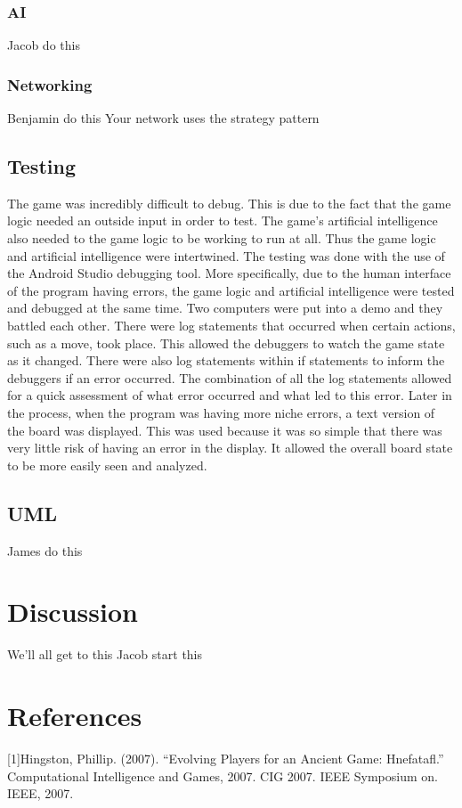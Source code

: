 \documentclass{article}
\begin{document}
\subsubsection{AI}
Jacob do this

\subsubsection{Networking}
Benjamin do this
Your network uses the strategy pattern

\subsection{Testing}
	The game was incredibly difficult to debug. This is due to the fact that the game logic needed an outside input in order to test. The game's artificial intelligence also needed to the game logic to be working to run at all. Thus the game logic and artificial intelligence were intertwined. 
	The testing was done with the use of the Android Studio debugging tool. More specifically, due to the human interface of the program having errors, the game logic and artificial intelligence were tested and debugged at the same time. Two computers were put into a demo and they battled each other. There were log statements that occurred when certain actions, such as a move, took place. This allowed the debuggers to watch the game state as it changed. There were also log statements within if statements to inform the debuggers if an error occurred. The combination of all the log statements allowed for a quick assessment of what error occurred and what led to this error. 
	Later in the process, when the program was having more niche errors, a text version of the board was displayed. This was used because it was so simple that there was very little risk of having an error in the display. It allowed the overall board state to be more easily seen and analyzed.

\subsection{UML}
James do this

\section{Discussion}
We'll all get to this
Jacob start this

\section{References}
[1]Hingston, Phillip. (2007). “Evolving Players for an Ancient Game: Hnefatafl.” Computational Intelligence and Games, 2007. CIG 2007. IEEE Symposium on. IEEE, 2007.
\end{document}
